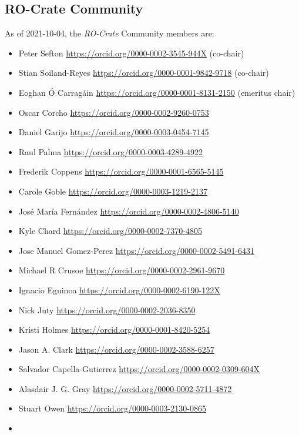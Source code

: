 \hypertarget{communitylist}{%
\subsection*{ RO-Crate Community}\label{communitylist}}

As of 2021-10-04, the \emph{RO-Crate} Community members are:

\begin{itemize}
\tightlist
\item
  Peter Sefton \url{https://orcid.org/0000-0002-3545-944X} (co-chair)
\item
  Stian Soiland-Reyes \url{https://orcid.org/0000-0001-9842-9718}
  (co-chair)
\item
  Eoghan Ó Carragáin \url{https://orcid.org/0000-0001-8131-2150}
  (emeritus chair)
\item
  Oscar Corcho \url{https://orcid.org/0000-0002-9260-0753}
\item
  Daniel Garijo \url{https://orcid.org/0000-0003-0454-7145}
\item
  Raul Palma \url{https://orcid.org/0000-0003-4289-4922}
\item
  Frederik Coppens \url{https://orcid.org/0000-0001-6565-5145}
\item
  Carole Goble \url{https://orcid.org/0000-0003-1219-2137}
\item
  José María Fernández \url{https://orcid.org/0000-0002-4806-5140}
\item
  Kyle Chard \url{https://orcid.org/0000-0002-7370-4805}
\item
  Jose Manuel Gomez-Perez \url{https://orcid.org/0000-0002-5491-6431}
\item
  Michael R Crusoe \url{https://orcid.org/0000-0002-2961-9670}
\item
  Ignacio Eguinoa \url{https://orcid.org/0000-0002-6190-122X}
\item
  Nick Juty \url{https://orcid.org/0000-0002-2036-8350}
\item
  Kristi Holmes \url{https://orcid.org/0000-0001-8420-5254}
\item
  Jason A. Clark \url{https://orcid.org/0000-0002-3588-6257}
\item
  Salvador Capella-Gutierrez \url{https://orcid.org/0000-0002-0309-604X}
\item
  Alasdair J. G. Gray \url{https://orcid.org/0000-0002-5711-4872}
\item
  Stuart Owen \url{https://orcid.org/0000-0003-2130-0865}
\item

\end{itemize}
